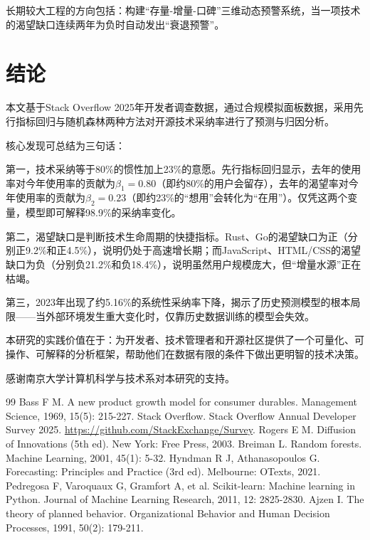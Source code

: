 \documentclass[fontset=windows]{cjc}
\begin{document}
长期较大工程的方向包括：构建“存量-增量-口碑”三维动态预警系统，当一项技术的渴望缺口连续两年为负时自动发出“衰退预警”。

\section{结论}
本文基于Stack Overflow 2025年开发者调查数据，通过合规模拟面板数据，采用先行指标回归与随机森林两种方法对开源技术采纳率进行了预测与归因分析。

核心发现可总结为三句话：

第一，技术采纳等于80\%的惯性加上23\%的意愿。先行指标回归显示，去年的使用率对今年使用率的贡献为$\beta_1=0.80$（即约80\%的用户会留存），去年的渴望率对今年使用率的贡献为$\beta_2=0.23$（即约23\%的“想用”会转化为“在用”）。仅凭这两个变量，模型即可解释98.9\%的采纳率变化。

第二，渴望缺口是判断技术生命周期的快捷指标。Rust、Go的渴望缺口为正（分别正9.2\%和正4.5\%），说明仍处于高速增长期；而JavaScript、HTML/CSS的渴望缺口为负（分别负21.2\%和负18.4\%），说明虽然用户规模庞大，但“增量水源”正在枯竭。

第三，2023年出现了约5.16\%的系统性采纳率下降，揭示了历史预测模型的根本局限——当外部环境发生重大变化时，仅靠历史数据训练的模型会失效。

本研究的实践价值在于：为开发者、技术管理者和开源社区提供了一个可量化、可操作、可解释的分析框架，帮助他们在数据有限的条件下做出更明智的技术决策。

\begin{acknowledgments}
感谢南京大学计算机科学与技术系对本研究的支持。
\end{acknowledgments}

\begin{thebibliography}{99}
 Bass F M. A new product growth model for consumer durables. Management Science, 1969, 15(5): 215-227.
 Stack Overflow. Stack Overflow Annual Developer Survey 2025. \url{https://github.com/StackExchange/Survey}.
 Rogers E M. Diffusion of Innovations (5th ed). New York: Free Press, 2003.
 Breiman L. Random forests. Machine Learning, 2001, 45(1): 5-32.
 Hyndman R J, Athanasopoulos G. Forecasting: Principles and Practice (3rd ed). Melbourne: OTexts, 2021.
 Pedregosa F, Varoquaux G, Gramfort A, et al. Scikit-learn: Machine learning in Python. Journal of Machine Learning Research, 2011, 12: 2825-2830.
 Ajzen I. The theory of planned behavior. Organizational Behavior and Human Decision Processes, 1991, 50(2): 179-211.
\end{thebibliography}
\end{document}
